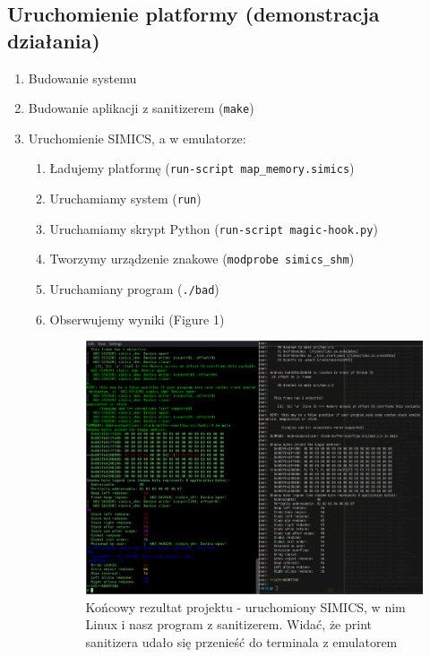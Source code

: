 \documentclass[../main.tex]{subfiles}
\begin{document}
\subsection{Uruchomienie platformy (demonstracja działania)}

\begin{enumerate}
	\item Budowanie systemu
	\item Budowanie aplikacji z sanitizerem (\texttt{make})
	
	\item Uruchomienie SIMICS, a w emulatorze:
	\begin{enumerate}
		\item Ładujemy platformę (\texttt{run-script map_memory.simics})
		\item Uruchamiamy system (\texttt{run})
		\item Uruchamiamy skrypt Python (\texttt{run-script magic-hook.py})
		\item Tworzymy urządzenie znakowe (\texttt{modprobe simics_shm})
		\item Uruchamiany program (\texttt{./bad})
		\item Obserwujemy wyniki (Figure 1)
			\begin{figure}
				\centering
				\includegraphics[width=\linewidth]{images/end}
				\caption{Końcowy rezultat projektu - uruchomiony SIMICS, w nim Linux i nasz program z sanitizerem. Widać, że print sanitizera udało się przenieść do terminala z emulatorem}
				\label{fig:end}
			\end{figure}
	\end{enumerate}
\end{enumerate}
\end{document}
